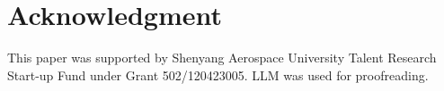 \documentclass[conference]{IEEEtran}
\begin{document}
\section*{Acknowledgment}

\vspace*{-0.5 \baselineskip} This paper was supported by Shenyang Aerospace University Talent Research Start-up Fund under Grant 502/120423005.  LLM was used for proofreading.



\end{document}
